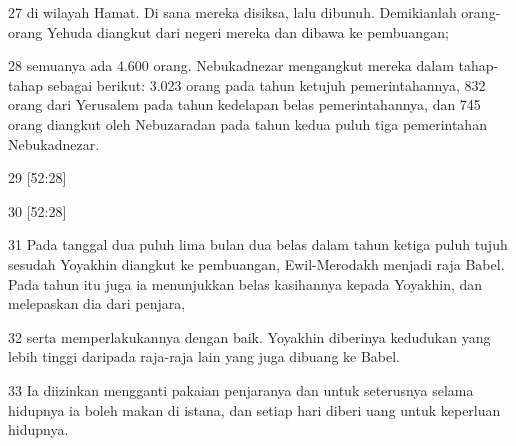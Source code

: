 \par 27 di wilayah Hamat. Di sana mereka disiksa, lalu dibunuh. Demikianlah orang-orang Yehuda diangkut dari negeri mereka dan dibawa ke pembuangan;
\par 28 semuanya ada 4.600 orang. Nebukadnezar mengangkut mereka dalam tahap-tahap sebagai berikut: 3.023 orang pada tahun ketujuh pemerintahannya, 832 orang dari Yerusalem pada tahun kedelapan belas pemerintahannya, dan 745 orang diangkut oleh Nebuzaradan pada tahun kedua puluh tiga pemerintahan Nebukadnezar.
\par 29 [52:28]
\par 30 [52:28]
\par 31 Pada tanggal dua puluh lima bulan dua belas dalam tahun ketiga puluh tujuh sesudah Yoyakhin diangkut ke pembuangan, Ewil-Merodakh menjadi raja Babel. Pada tahun itu juga ia menunjukkan belas kasihannya kepada Yoyakhin, dan melepaskan dia dari penjara,
\par 32 serta memperlakukannya dengan baik. Yoyakhin diberinya kedudukan yang lebih tinggi daripada raja-raja lain yang juga dibuang ke Babel.
\par 33 Ia diizinkan mengganti pakaian penjaranya dan untuk seterusnya selama hidupnya ia boleh makan di istana, dan setiap hari diberi uang untuk keperluan hidupnya.


